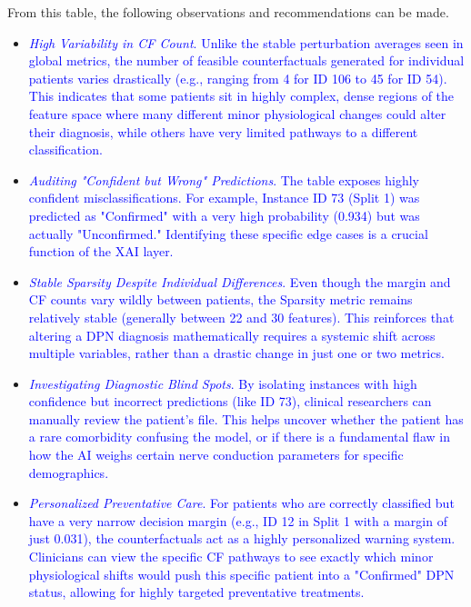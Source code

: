 \documentclass[fleqn,10pt]{wlscirep}
\begin{document}
From this table, the following observations and recommendations can be made.
\begin{itemize}
    \item \textcolor{blue}{\textit{High Variability in CF Count}. Unlike the stable perturbation averages seen in global metrics, the number of feasible counterfactuals generated for individual patients varies drastically (e.g., ranging from 4 for ID 106 to 45 for ID 54). This indicates that some patients sit in highly complex, dense regions of the feature space where many different minor physiological changes could alter their diagnosis, while others have very limited pathways to a different classification.}
    
    \item \textcolor{blue}{\textit{Auditing "Confident but Wrong" Predictions}. The table exposes highly confident misclassifications. For example, Instance ID 73 (Split 1) was predicted as "Confirmed" with a very high probability (0.934) but was actually "Unconfirmed." Identifying these specific edge cases is a crucial function of the XAI layer.}

    \item \textcolor{blue}{\textit{Stable Sparsity Despite Individual Differences}. Even though the margin and CF counts vary wildly between patients, the Sparsity metric remains relatively stable (generally between 22 and 30 features). This reinforces that altering a DPN diagnosis mathematically requires a systemic shift across multiple variables, rather than a drastic change in just one or two metrics.}

    \item \textcolor{blue}{\textit{Investigating Diagnostic Blind Spots}. By isolating instances with high confidence but incorrect predictions (like ID 73), clinical researchers can manually review the patient's file. This helps uncover whether the patient has a rare comorbidity confusing the model, or if there is a fundamental flaw in how the AI weighs certain nerve conduction parameters for specific demographics.}

    \item \textcolor{blue}{\textit{Personalized Preventative Care}. For patients who are correctly classified but have a very narrow decision margin (e.g., ID 12 in Split 1 with a margin of just 0.031), the counterfactuals act as a highly personalized warning system. Clinicians can view the specific CF pathways to see exactly which minor physiological shifts would push this specific patient into a "Confirmed" DPN status, allowing for highly targeted preventative treatments.}
\end{itemize}
\end{document}
